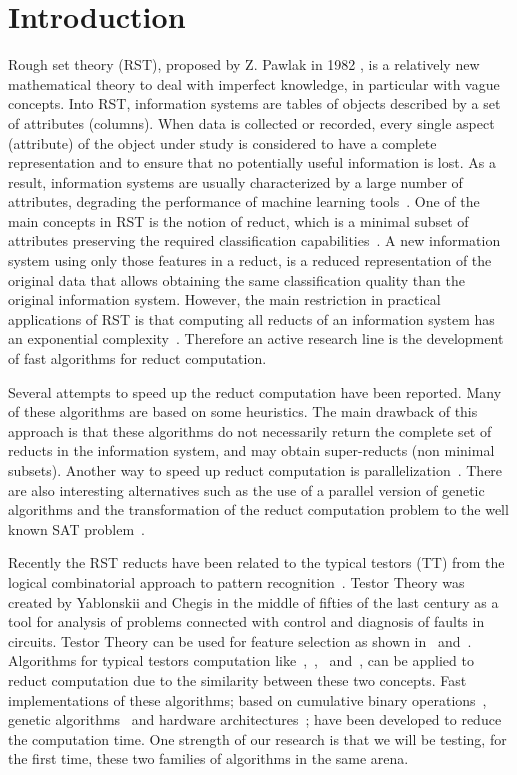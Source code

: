 \documentclass[authoryear,11pt]{elsarticle}
\begin{document}
\section{Introduction}
  Rough set theory (RST), proposed by Z. Pawlak in 1982 \citep{Pawlak81,Pawlak81-2,Pawlak82,Pawlak91}, 
  is a relatively new mathematical theory 
  to deal with imperfect knowledge, in particular with vague concepts. Into RST, information systems
  are tables of objects described by a set of attributes (columns). 
  When data is collected or recorded, every single aspect (attribute) of the object under study is considered 
  to have a complete representation and to ensure that no potentially useful information is lost.
  As a result, information systems are usually characterized by a large number of attributes,
  degrading the performance of machine learning tools~\citep{Parthalain08}.
  One of the main concepts in RST is the notion of reduct, which is a minimal subset of attributes 
  preserving the required classification capabilities~\citep{Pawlak91}. A new information system using 
  only those features in a reduct, is a reduced representation of the original data that allows obtaining  
  the same classification quality than the original information system. 
  However, the main restriction in practical applications of RST is that computing all reducts of an information 
  system has an exponential complexity~\citep{Skowron92}. Therefore an active research line is the development 
  of fast algorithms for reduct computation.
  
  Several attempts to speed up the reduct computation have been reported. Many of these algorithms are 
  based on some heuristics. The main drawback of this approach is that these algorithms do not necessarily 
  return the complete set of reducts in the information system, and may obtain super-reducts (non minimal subsets). 
  Another way to speed up reduct computation is parallelization~\citep{Strakowski08}. There are also 
  interesting alternatives such as the use of a parallel version of genetic algorithms \citep{Wroblewski98}
  and the transformation of the reduct computation problem to the well known SAT problem~\citep{Jensen14}.
  
  Recently the RST reducts have been related to the typical testors (TT) from the logical combinatorial approach to 
  pattern recognition~\citep{Lazo15}. Testor Theory was created by Yablonskii and Chegis in the middle of fifties 
  of the last century as a tool for analysis of problems connected with control and diagnosis of faults in
  circuits. 
  Testor Theory can be used for feature selection as shown in~\citep{Ruiz08} and~\citep{Martinez01}. Algorithms for
  typical testors computation like~\citep{Ruiz85},~\citep{Santiesteban03},~\citep{Sanchez07} 
  and~\citep{Lias09}, can be applied to reduct computation due to the similarity between these two concepts. 
  Fast implementations of these algorithms; based on cumulative binary operations~\citep{Sanchez10}, genetic 
  algorithms~\citep{Sanchez99} and hardware architectures~\citep{Rojas12}; have been developed to reduce the
  computation time. One strength of our research is that we will be testing, for the first time, these two 
  families of algorithms in the same arena.
     
\end{document}
